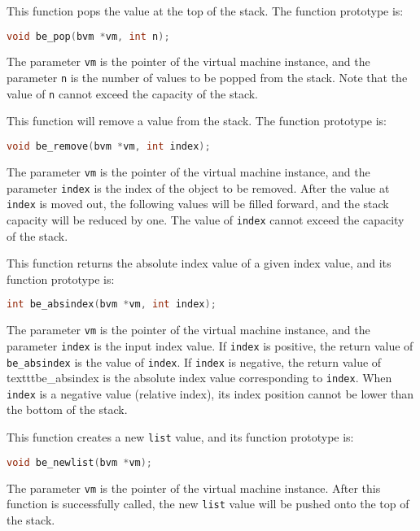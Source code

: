 
This function pops the value at the top of the stack. The function prototype is:
\begin{lstlisting}[language=c, style=berry, numbers=none]
void be_pop(bvm *vm, int n);
\end{lstlisting}
The parameter \texttt{vm} is the pointer of the virtual machine instance, and the parameter \texttt{n} is the number of values   to be popped from the stack. Note that the value of \texttt{n} cannot exceed the capacity of the stack.


This function will remove a value from the stack. The function prototype is:
\begin{lstlisting}[language=c, style=berry, numbers=none]
void be_remove(bvm *vm, int index);
\end{lstlisting}
The parameter \texttt{vm} is the pointer of the virtual machine instance, and the parameter \texttt{index} is the index of the object to be removed. After the value at \texttt{index} is moved out, the following values   will be filled forward, and the stack capacity will be reduced by one. The value of \texttt{index} cannot exceed the capacity of the stack.

This function returns the absolute index value of a given index value, and its function prototype is:
\begin{lstlisting}[language=c, style=berry, numbers=none]
int be_absindex(bvm *vm, int index);
\end{lstlisting}
The parameter \texttt{vm} is the pointer of the virtual machine instance, and the parameter \texttt{index} is the input index value. If \texttt{index} is positive, the return value of \texttt{be\_absindex} is the value of \texttt{index}. If \texttt{index} is negative, the return value of texttt{be\_absindex} is the absolute index value corresponding to \texttt{index}. When \texttt{index} is a negative value (relative index), its index position cannot be lower than the bottom of the stack.


This function creates a new \texttt{list} value, and its function prototype is:
\begin{lstlisting}[language=c, style=berry, numbers=none]
void be_newlist(bvm *vm);
\end{lstlisting}
The parameter \texttt{vm} is the pointer of the virtual machine instance. After this function is successfully called, the new \texttt{list} value will be pushed onto the top of the stack.

